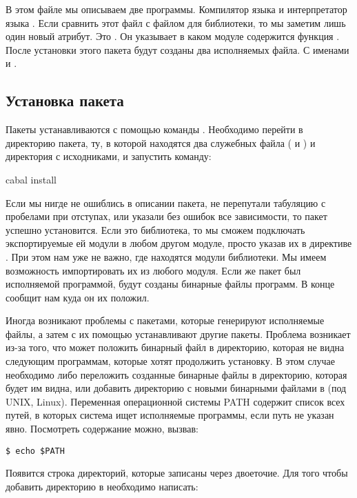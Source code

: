 В этом файле мы описываем две программы. Компилятор языка и
интерпретатор языка . Если сравнить этот файл с файлом для
библиотеки, то мы заметим лишь один новый атрибут. Это . Он
указывает в каком модуле содержится функция . После установки
этого пакета будут созданы два исполняемых файла. С именами  и
.

\subsection{Установка пакета}

Пакеты устанавливаются с помощью команды . Необходимо
перейти в директорию пакета, ту, в которой находятся два служебных файла
( и ) и директория с исходниками, и запустить
команду:


\begin{code}
cabal install
\end{code}

Если мы нигде не ошиблись в описании пакета, не перепутали табуляцию с
пробелами при отступах, или указали без ошибок все зависимости, то пакет
успешно установится. Если это библиотека, то мы сможем подключать
экспортируемые ей модули в любом другом модуле, просто указав их в
директиве . При этом нам уже не важно, где находятся модули
библиотеки. Мы имеем возможность импортировать их из любого модуля. Если
же пакет был исполняемой программой, будут созданы бинарные файлы
программ. В конце  сообщит нам куда он их положил.

Иногда возникают проблемы с пакетами, которые генерируют исполняемые
файлы, а затем с их помощью устанавливают другие пакеты. Проблема
возникает из-за того, что  может положить бинарный файл в
директорию, которая не видна следующим программам, которые хотят
продолжить установку. В этом случае необходимо либо переложить созданные
бинарные файлы в директорию, которая будет им видна, или добавить
директорию с новыми бинарными файлами в  (под UNIX, Linux).
Переменная операционной системы PATH содержит список всех путей, в
которых система ищет исполняемые программы, если путь не указан явно.
Посмотреть содержание  можно, вызвав:


\begin{verbatim}
$ echo $PATH
\end{verbatim}

Появится строка директорий, которые записаны через двоеточие. Для того
чтобы добавить директорию  в  необходимо
написать:


